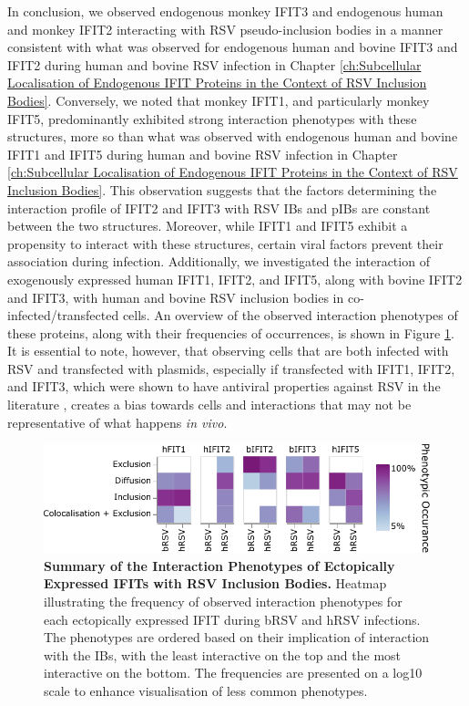 In conclusion, we observed endogenous monkey IFIT3 and endogenous human and monkey IFIT2 interacting with RSV pseudo-inclusion bodies in a manner consistent with what was observed for endogenous human and bovine IFIT3 and IFIT2 during human and bovine RSV infection in Chapter \ref{ch:Subcellular Localisation of Endogenous IFIT Proteins in the Context of RSV Inclusion Bodies}. Conversely, we noted that monkey IFIT1, and particularly monkey IFIT5, predominantly exhibited strong interaction phenotypes with these structures, more so than what was observed with endogenous human and bovine IFIT1 and IFIT5 during human and bovine RSV infection in Chapter \ref{ch:Subcellular Localisation of Endogenous IFIT Proteins in the Context of RSV Inclusion Bodies}. This observation suggests that the factors determining the interaction profile of IFIT2 and IFIT3 with RSV IBs and pIBs are constant between the two structures. Moreover, while IFIT1 and IFIT5 exhibit a propensity to interact with these structures, certain viral factors prevent their association during infection. Additionally, we investigated the interaction of exogenously expressed human IFIT1, IFIT2, and IFIT5, along with bovine IFIT2 and IFIT3, with human and bovine RSV inclusion bodies in co-infected/transfected cells. An overview of the observed interaction phenotypes of these proteins, along with their frequencies of occurrences, is shown in Figure \ref{fig:Summary of the Interaction Phenotypes of Ectopically Expressed IFITs with RSV Inclusion Bodies}. It is essential to note, however, that observing cells that are both infected with RSV and transfected with plasmids, especially if transfected with IFIT1, IFIT2, and IFIT3, which were shown to have antiviral properties against RSV in the literature \cite{Drori2020InfluenzaProteins}, creates a bias towards cells and interactions that may not be representative of what happens \textit{in vivo}.

\begin{figure}
    \centering
    \includegraphics[width=1\linewidth]{09. Chapter 4/Figs/heatmap-infection-transfection.pdf}
    \caption[Summary of the Interaction Phenotypes of Ectopically Expressed IFITs with RSV Inclusion Bodies.]{\textbf{Summary of the Interaction Phenotypes of Ectopically Expressed IFITs with RSV Inclusion Bodies.} Heatmap illustrating the frequency of observed interaction phenotypes for each ectopically expressed IFIT during bRSV and hRSV infections. The phenotypes are ordered based on their implication of interaction with the IBs, with the least interactive on the top and the most interactive on the bottom. The frequencies are presented on a log10 scale to enhance visualisation of less common phenotypes.}
    \label{fig:Summary of the Interaction Phenotypes of Ectopically Expressed IFITs with RSV Inclusion Bodies}
\end{figure}

